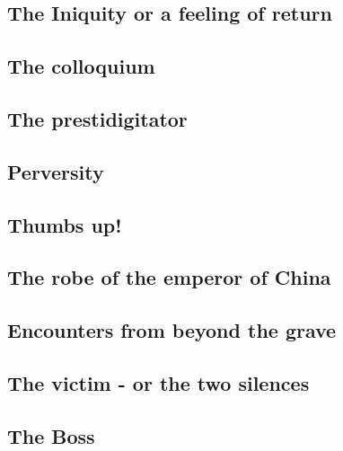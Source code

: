 \subsection{The Iniquity or a feeling of return}


\subsection{The colloquium}


\subsection{The prestidigitator}


\subsection{Perversity}


\subsection{Thumbs up!}


\subsection{The robe of the emperor of China}


\subsection{Encounters from beyond the grave}



\subsection{The victim - or the two silences}




\subsection{The Boss}

